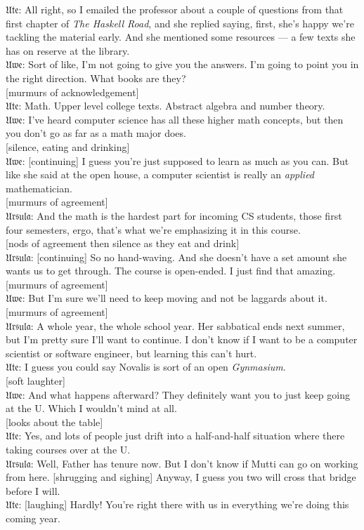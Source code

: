 \documentclass[american]{article}
\begin{document}
𝔘𝔱𝔢: All right, so I
emailed the professor about a couple of questions from that first
chapter of \emph{The Haskell Road}, and she replied saying, first, she's
happy we're tackling the material early. And she mentioned some
resources --- a few texts she has on reserve at the library. \\[0pt]
𝔘𝔴𝔢: Sort of like, I'm
not going to give you the answers. I'm going to point you in the right
direction. What books are they? \\[0pt]
[murmurs of acknowledgement] \\[0pt]
𝔘𝔱𝔢: Math. Upper level
college texts. Abstract algebra and number theory. \\[0pt]
𝔘𝔴𝔢: I've heard
computer science has all these higher math concepts, but then you
don't go as far as a math major does. \\[0pt]
[silence, eating and drinking] \\[0pt]
𝔘𝔴𝔢: [continuing] I
guess you're just supposed to learn as much as you can. But like she
said at the open house, a computer scientist is really an \emph{applied}
mathematician. \\[0pt]
[murmurs of agreement] \\[0pt]
𝔘𝔯𝔰𝔲𝔩𝔞: And the math is
the hardest part for incoming CS students, those first four semesters,
ergo, that's what we're emphasizing it in this course. \\[0pt]
[nods of agreement then silence as they eat and drink] \\[0pt]
𝔘𝔯𝔰𝔲𝔩𝔞: [continuing] So
no hand-waving. And she doesn't have a set amount she wants us to get
through. The course is open-ended. I just find that amazing. \\[0pt]
[murmurs of agreement] \\[0pt]
𝔘𝔴𝔢: But I'm sure we'll
need to keep moving and not be laggards about it. \\[0pt]
[murmurs of agreement] \\[0pt]
𝔘𝔯𝔰𝔲𝔩𝔞: A whole year,
the whole school year. Her sabbatical ends next summer, but I'm pretty
sure I'll want to continue. I don't know if I want to be a computer
scientist or software engineer, but learning this can't hurt. \\[0pt]
𝔘𝔱𝔢: I guess you could
say Novalis is sort of an open \emph{Gynmasium}. \\[0pt]
[soft laughter] \\[0pt]
𝔘𝔴𝔢: And what happens
afterward? They definitely want you to just keep going at the U. Which
I wouldn't mind at all. \\[0pt]
[looks about the table] \\[0pt]
𝔘𝔱𝔢: Yes, and lots of
people just drift into a half-and-half situation where there taking
courses over at the U. \\[0pt]
𝔘𝔯𝔰𝔲𝔩𝔞: Well, Father
has tenure now. But I don't know if Mutti can go on working from
here. [shrugging and sighing] Anyway, I guess you two will cross that
bridge before I will. \\[0pt]
𝔘𝔱𝔢: [laughing] Hardly!
You're right there with us in everything we're doing this coming year.
\end{document}
